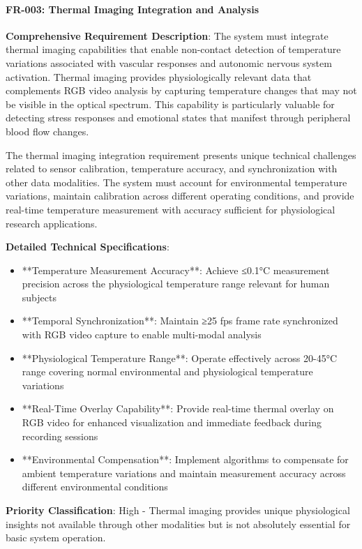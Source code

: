 \documentclass[12pt,a4paper]{article}
\begin{document}
\paragraph{FR-003: Thermal Imaging Integration and Analysis}

\textbf{Comprehensive Requirement Description}: The system must integrate thermal imaging capabilities that enable
non-contact detection of temperature variations associated with vascular responses and autonomic nervous system
activation. Thermal imaging provides physiologically relevant data that complements RGB video analysis by capturing
temperature changes that may not be visible in the optical spectrum. This capability is particularly valuable for
detecting stress responses and emotional states that manifest through peripheral blood flow changes.

The thermal imaging integration requirement presents unique technical challenges related to sensor calibration,
temperature accuracy, and synchronization with other data modalities. The system must account for environmental
temperature variations, maintain calibration across different operating conditions, and provide real-time temperature
measurement with accuracy sufficient for physiological research applications.

\textbf{Detailed Technical Specifications}:

\begin{itemize}
\item **Temperature Measurement Accuracy**: Achieve ≤0.1°C measurement precision across the physiological temperature range
  relevant for human subjects
\item **Temporal Synchronization**: Maintain ≥25 fps frame rate synchronized with RGB video capture to enable multi-modal
  analysis
\item **Physiological Temperature Range**: Operate effectively across 20-45°C range covering normal environmental and
  physiological temperature variations
\item **Real-Time Overlay Capability**: Provide real-time thermal overlay on RGB video for enhanced visualization and
  immediate feedback during recording sessions
\item **Environmental Compensation**: Implement algorithms to compensate for ambient temperature variations and maintain
  measurement accuracy across different environmental conditions

\end{itemize}
\textbf{Priority Classification}: High - Thermal imaging provides unique physiological insights not available through other
modalities but is not absolutely essential for basic system operation.
\end{document}
